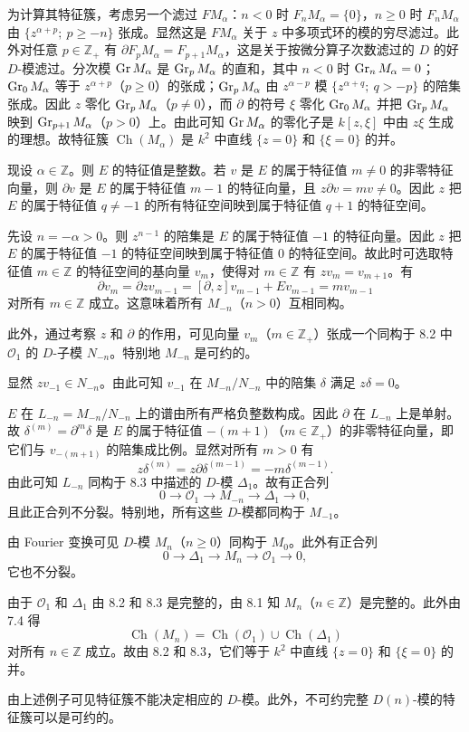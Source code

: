 \begin{example}
为计算其特征簇，考虑另一个滤过 $F M_\alpha$：$n<0$ 时 $F_nM_\alpha=\{0\}$，$n\ge 0$ 时 $F_nM_\alpha$ 由 $\{z^{\alpha+p};\ p\ge -n\}$ 张成。显然这是 $F M_\alpha$ 关于 $z$ 中多项式环的模的穷尽滤过。此外对任意 $p\in\mathbb{Z}_+$ 有 $\partial F_pM_\alpha=F_{p+1}M_\alpha$，这是关于按微分算子次数滤过的 $D$ 的好 $D$-模滤过。分次模 $\operatorname{Gr} M_\alpha$ 是 $\operatorname{Gr}_pM_\alpha$ 的直和，其中 $n<0$ 时 $\operatorname{Gr}_nM_\alpha=0$；$\operatorname{Gr}_0M_\alpha$ 等于 $z^{\alpha+p}$（$p\ge 0$）的张成；$\operatorname{Gr}_pM_\alpha$ 由 $z^{\alpha-p}$ 模 $\{z^{\alpha+q};\ q>-p\}$ 的陪集张成。因此 $z$ 零化 $\operatorname{Gr}_pM_\alpha$（$p\neq 0$），而 $\partial$ 的符号 $\xi$ 零化 $\operatorname{Gr}_0M_\alpha$ 并把 $\operatorname{Gr}_pM_\alpha$ 映到 $\operatorname{Gr}_{p+1}M_\alpha$（$p>0$）上。由此可知 $\operatorname{Gr} M_\alpha$ 的零化子是 $k[z,\xi]$ 中由 $z\xi$ 生成的理想。故特征簇 $\operatorname{Ch}(M_\alpha)$ 是 $k^2$ 中直线 $\{z=0\}$ 和 $\{\xi=0\}$ 的并。

现设 $\alpha\in\mathbb{Z}$。则 $E$ 的特征值是整数。若 $v$ 是 $E$ 的属于特征值 $m\neq 0$ 的非零特征向量，则 $\partial v$ 是 $E$ 的属于特征值 $m-1$ 的特征向量，且 $z\partial v=mv\neq 0$。因此 $z$ 把 $E$ 的属于特征值 $q\neq -1$ 的所有特征空间映到属于特征值 $q+1$ 的特征空间。

先设 $n=-\alpha>0$。则 $z^{n-1}$ 的陪集是 $E$ 的属于特征值 $-1$ 的特征向量。因此 $z$ 把 $E$ 的属于特征值 $-1$ 的特征空间映到属于特征值 $0$ 的特征空间。故此时可选取特征值 $m\in\mathbb{Z}$ 的特征空间的基向量 $v_m$，使得对 $m\in\mathbb{Z}$ 有 $zv_m=v_{m+1}$。有
$$\partial v_m=\partial z v_{m-1}=[\partial,z]v_{m-1}+Ev_{m-1}=mv_{m-1}$$
对所有 $m\in\mathbb{Z}$ 成立。这意味着所有 $M_{-n}$（$n>0$）互相同构。

此外，通过考察 $z$ 和 $\partial$ 的作用，可见向量 $v_m$（$m\in\mathbb{Z}_+$）张成一个同构于 8.2 中 $\mathcal{O}_1$ 的 $D$-子模 $N_{-n}$。特别地 $M_{-n}$ 是可约的。

显然 $zv_{-1}\in N_{-n}$。由此可知 $v_{-1}$ 在 $M_{-n}/N_{-n}$ 中的陪集 $\delta$ 满足 $z\delta=0$。

$E$ 在 $L_{-n}=M_{-n}/N_{-n}$ 上的谱由所有严格负整数构成。因此 $\partial$ 在 $L_{-n}$ 上是单射。故 $\delta^{(m)}=\partial^m\delta$ 是 $E$ 的属于特征值 $-(m+1)$（$m\in\mathbb{Z}_+$）的非零特征向量，即它们与 $v_{-(m+1)}$ 的陪集成比例。显然对所有 $m>0$ 有
$$z\delta^{(m)}=z\partial\delta^{(m-1)}=-m\delta^{(m-1)}.$$
由此可知 $L_{-n}$ 同构于 8.3 中描述的 $D$-模 $\Delta_1$。故有正合列
$$0\longrightarrow\mathcal{O}_1\longrightarrow M_{-n}\longrightarrow\Delta_1\longrightarrow 0,$$
且此正合列不分裂。特别地，所有这些 $D$-模都同构于 $M_{-1}$。

由 Fourier 变换可见 $D$-模 $M_n$（$n\ge 0$）同构于 $M_0$。此外有正合列
$$0\longrightarrow\Delta_1\longrightarrow M_n\longrightarrow\mathcal{O}_1\longrightarrow 0,$$
它也不分裂。

由于 $\mathcal{O}_1$ 和 $\Delta_1$ 由 8.2 和 8.3 是完整的，由 8.1 知 $M_n$（$n\in\mathbb{Z}$）是完整的。此外由 7.4 得
$$\operatorname{Ch}(M_n)=\operatorname{Ch}(\mathcal{O}_1)\cup\operatorname{Ch}(\Delta_1)$$
对所有 $n\in\mathbb{Z}$ 成立。故由 8.2 和 8.3，它们等于 $k^2$ 中直线 $\{z=0\}$ 和 $\{\xi=0\}$ 的并。

由上述例子可见特征簇不能决定相应的 $D$-模。此外，不可约完整 $D(n)$-模的特征簇可以是可约的。
\end{example}

